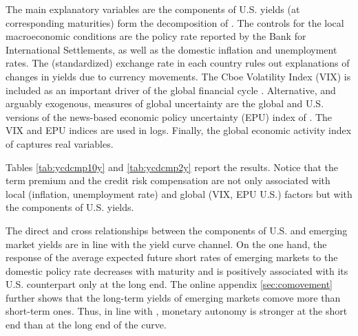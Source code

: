 \documentclass[a4paper, 12pt]{article}
\begin{document}
The main explanatory variables are the components of U.S. yields (at corresponding maturities) form the decomposition of \cite{KimWright:2005}. The controls for the local macroeconomic conditions are the policy rate reported by the Bank for International Settlements, as well as the domestic inflation and unemployment rates. The (standardized) exchange rate in each country rules out explanations of changes in yields due to currency movements. The Cboe Volatility Index (VIX) is included as an important driver of the global financial cycle \citep{Rey:2013}. Alternative, and arguably exogenous, measures of global uncertainty are the global and U.S. versions of the news-based economic policy uncertainty (EPU) index of \cite{BakerBloomDavis:2016}. The VIX and EPU indices are used in logs. Finally, the global economic activity index of \cite{Hamilton:2021} captures real variables. 

Tables \ref{tab:ycdcmp10y} and \ref{tab:ycdcmp2y} report the results. Notice that the term premium and the credit risk compensation are not only associated with local (inflation, unemployment rate) and global (VIX, EPU U.S.) factors but with the components of U.S. yields. 

The direct and cross relationships between the components of U.S. and emerging market yields are in line with the yield curve channel. On the one hand, the response of the average expected future short rates of emerging markets to the domestic policy rate decreases with maturity and is positively associated with its U.S. counterpart only at the long end. The online appendix \ref{sec:comovement} further shows that the long-term yields of emerging markets comove more than short-term ones. Thus, in line with \cite{Obstfeld:2015}, monetary autonomy is stronger at the short end than at the long end of the curve. 
\end{document}

